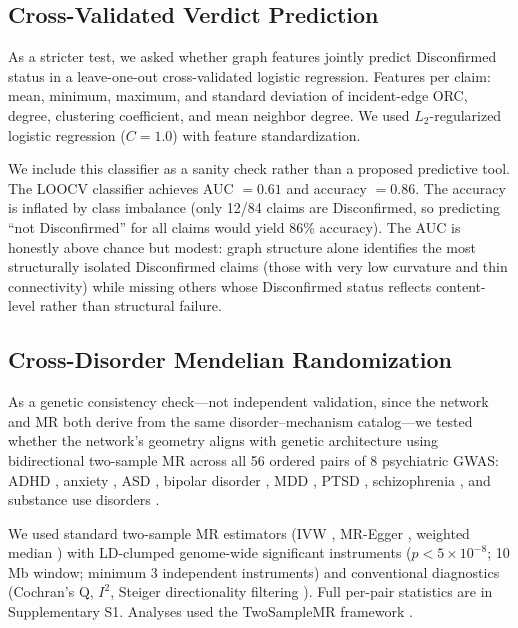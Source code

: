 \documentclass[11pt]{article}
\begin{document}
\subsection{Cross-Validated Verdict Prediction}
\label{sec:prediction}

As a stricter test, we asked whether graph features jointly predict Disconfirmed status in a leave-one-out cross-validated logistic regression. Features per claim: mean, minimum, maximum, and standard deviation of incident-edge ORC, degree, clustering coefficient, and mean neighbor degree. We used $L_2$-regularized logistic regression ($C = 1.0$) with feature standardization.

We include this classifier as a sanity check rather than a proposed predictive tool. The LOOCV classifier achieves AUC $= 0.61$ and accuracy $= 0.86$. The accuracy is inflated by class imbalance (only 12/84 claims are Disconfirmed, so predicting ``not Disconfirmed'' for all claims would yield 86\% accuracy). The AUC is honestly above chance but modest: graph structure alone identifies the most structurally isolated Disconfirmed claims (those with very low curvature and thin connectivity) while missing others whose Disconfirmed status reflects content-level rather than structural failure.

\subsection{Cross-Disorder Mendelian Randomization}
\label{sec:mr}

As a genetic consistency check---not independent validation, since the network and MR both derive from the same disorder--mechanism catalog---we tested whether the network's geometry aligns with genetic architecture using bidirectional two-sample MR across all 56 ordered pairs of 8 psychiatric GWAS: ADHD \citep{demontis2023genome}, anxiety \citep{levey2020reproducible}, ASD \citep{grove2019identification}, bipolar disorder \citep{mullins2021genome}, MDD \citep{als2023depression}, PTSD \citep{nievergelt2024genome}, schizophrenia \citep{trubetskoy2022mapping}, and substance use disorders \citep{hatoum2023multivariate}.

We used standard two-sample MR estimators (IVW \citep{burgess2013mendelian}, MR-Egger \citep{bowden2015mendelian}, weighted median \citep{bowden2016consistent}) with LD-clumped genome-wide significant instruments ($p < 5 \times 10^{-8}$; 10\,Mb window; minimum 3 independent instruments) and conventional diagnostics (Cochran's Q, $I^2$, Steiger directionality filtering \citep{hemani2017orienting}). Full per-pair statistics are in Supplementary S1. Analyses used the TwoSampleMR framework \citep{hemani2018mrbase}.
\end{document}
